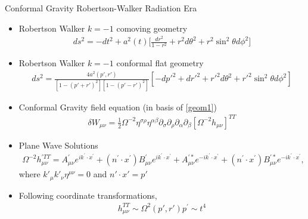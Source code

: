 \documentclass[8pt,aspectratio=1610]{beamer}
\begin{document}
\begin{frame}{Conformal Gravity Robertson-Walker Radiation Era}
	\begin{itemize}
		\item Robertson Walker $k=-1$ comoving geometry
		\begin{eqnarray}
			ds^2 = -dt^2 + a^2(t)\bigg[\frac{dr^2}{1-r^2} + r^2 d\theta^2 + r^2 \sin^2\theta d\phi^2\bigg]
		\end{eqnarray}	
		\item Robertson Walker $k=-1$ conformal flat geometry
		\begin{eqnarray}
		ds^2 = \frac{4a^2(p',r')}{[1-(p'+r')^2][1-(p'-r')^2]}[-dp'^2 + dr'^2 +r'^2 d\theta^2 + r'^2\sin^2\theta d\phi^2]
		\label{geom1}
		\end{eqnarray}
		\item Conformal Gravity field equation (in basis of \eqref{geom1})
		\begin{eqnarray}
		\delta W_{\mu\nu}=\frac{1}{2}\Omega^{-2}\eta^{\sigma\rho}\eta^{\alpha\beta}\partial_{\sigma}\partial_{\rho} \partial_{\alpha}\partial_{\beta}[\Omega^{-2}h_{\mu\nu}]^{TT}
		\end{eqnarray} 
		\item Plane Wave Solutions
		\begin{eqnarray}
		\Omega^{-2}h_{\mu\nu}^{'TT}=A^{\prime}_{\mu\nu}e^{ik^{\prime}\cdot x^{\prime}}+(n^{\prime}\cdot x^{\prime})B^{\prime}_{\mu\nu}e^{ik^{\prime}\cdot x^{\prime}}+A^{\prime *}_{\mu\nu}e^{-ik^{\prime}\cdot x^{\prime}}+(n^{\prime}\cdot x^{\prime})B^{\prime *}_{\mu\nu}e^{-ik^{\prime}\cdot x^{\prime}},
		\end{eqnarray}
		where $k'_\mu k'_\nu \eta^{\mu\nu} = 0$ and $n'\cdot x' = p'$
		\item Following coordinate transformations,
		\begin{eqnarray}
		h_{\mu\nu}^{TT} \sim \Omega^2(p',r')p^{\prime}\sim t^4
		\end{eqnarray}
	\end{itemize}
\end{frame}


\end{document}

